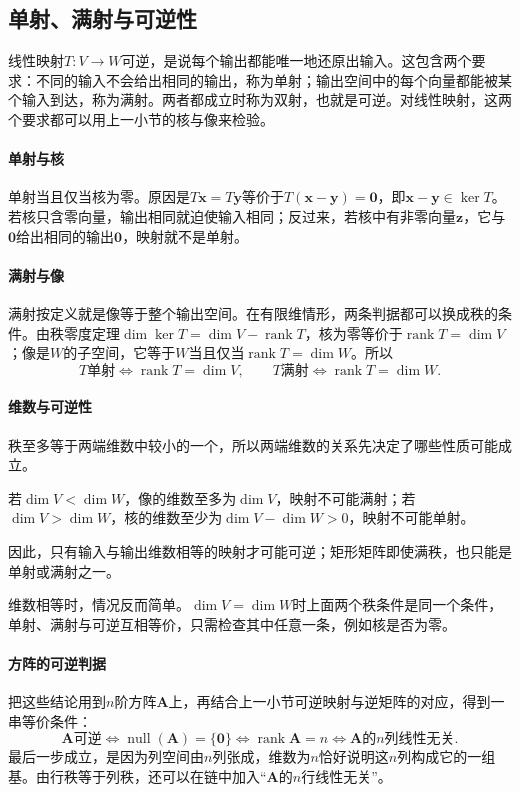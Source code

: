 \subsection{单射、满射与可逆性}
\label{sec:ls-injective-surjective-invertible}
线性映射$T:V\to W$可逆，是说每个输出都能唯一地还原出输入。这包含两个要求：不同的输入不会给出相同的输出，称为单射；输出空间中的每个向量都能被某个输入到达，称为满射。两者都成立时称为双射，也就是可逆。对线性映射，这两个要求都可以用上一小节的核与像来检验。

\paragraph{单射与核}
单射当且仅当核为零。原因是$T\bm x=T\bm y$等价于$T(\bm x-\bm y)=\bm0$，即$\bm x-\bm y\in\ker T$。若核只含零向量，输出相同就迫使输入相同；反过来，若核中有非零向量$\bm z$，它与$\bm0$给出相同的输出$\bm0$，映射就不是单射。

\paragraph{满射与像}
满射按定义就是像等于整个输出空间。在有限维情形，两条判据都可以换成秩的条件。由秩零度定理$\dim\ker T=\dim V-\operatorname{rank}T$，核为零等价于$\operatorname{rank}T=\dim V$；像是$W$的子空间，它等于$W$当且仅当$\operatorname{rank}T=\dim W$。所以
\[
 T\text{单射}\iff\operatorname{rank}T=\dim V,\qquad
 T\text{满射}\iff\operatorname{rank}T=\dim W.
\]

\paragraph{维数与可逆性}
秩至多等于两端维数中较小的一个，所以两端维数的关系先决定了哪些性质可能成立。

若$\dim V<\dim W$，像的维数至多为$\dim V$，映射不可能满射；若$\dim V>\dim W$，核的维数至少为$\dim V-\dim W>0$，映射不可能单射。

因此，只有输入与输出维数相等的映射才可能可逆；矩形矩阵即使满秩，也只能是单射或满射之一。

维数相等时，情况反而简单。$\dim V=\dim W$时上面两个秩条件是同一个条件，单射、满射与可逆互相等价，只需检查其中任意一条，例如核是否为零。

\paragraph{方阵的可逆判据}
把这些结论用到$n$阶方阵$\bm A$上，再结合上一小节可逆映射与逆矩阵的对应，得到一串等价条件：
\[
 \bm A\text{可逆}
 \iff\operatorname{null}(\bm A)=\{\bm0\}
 \iff\operatorname{rank}\bm A=n
 \iff\bm A\text{的}n\text{列线性无关}.
\]
最后一步成立，是因为列空间由$n$列张成，维数为$n$恰好说明这$n$列构成它的一组基。由行秩等于列秩，还可以在链中加入“$\bm A$的$n$行线性无关”。

